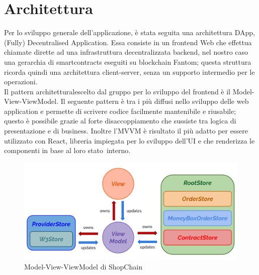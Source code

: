 \section{Architettura} \label{section:architettura}

Per lo sviluppo generale dell'applicazione, è stata seguita una architettura DApp\glo, (Fully) Decentralised Application.
Essa consiste in un frontend Web che effettua chiamate dirette ad una infrastruttura decentralizzata backend, nel 
nostro caso una gerarchia di smartcontracts eseguiti su blockchain Fantom; 
questa struttura ricorda quindi una architettura client-server, senza un supporto intermedio per le operazioni.
\\
Il pattern architetturale\glo scelto dal gruppo per lo sviluppo del frontend è il Model-View-ViewModel\glo. Il
seguente pattern è tra i più diffusi nello sviluppo delle web application e permette di scrivere codice
facilmente mantenibile e riusabile; questo è possibile grazie al forte disaccoppiamento che sussiste tra
logica di presentazione e di business. Inoltre l'MVVM è risultato il più adatto per essere utilizzato con
React, libreria impiegata per lo sviluppo dell'UI e che renderizza le componenti in base al loro stato\glo\ interno.

\begin{figure}[H]
    \centering
    \includegraphics[scale=0.3]{immagini/mvvm.png}
    \caption{Model-View-ViewModel di ShopChain}
\end{figure}

